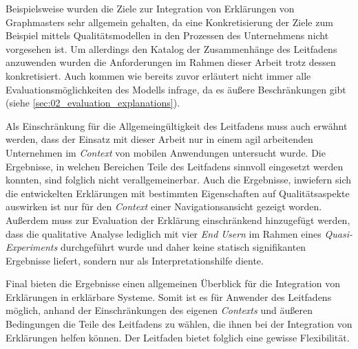 Beispielsweise wurden die Ziele zur Integration von Erklärungen von Graphmasters sehr allgemein gehalten, da eine Konkretisierung der Ziele zum Beispiel mittels Qualitätsmodellen \cite{schneider2012abenteuer} in den Prozessen des Unternehmens nicht vorgesehen ist. Um allerdings den Katalog der Zusammenhänge des Leitfadens anzuwenden wurden die Anforderungen im Rahmen dieser Arbeit trotz dessen konkretisiert. Auch kommen wie bereits zuvor erläutert nicht immer alle Evaluationsmöglichkeiten des Modells infrage, da es äußere Beschränkungen gibt (siehe \autoref{sec:02_evaluation_explanations}).

Als Einschränkung für die Allgemeingültigkeit des Leitfadens muss auch erwähnt werden, dass der Einsatz mit dieser Arbeit nur in einem agil arbeitenden Unternehmen im \textit{Context} von mobilen Anwendungen untersucht wurde. Die Ergebnisse, in welchen Bereichen Teile des Leitfadens sinnvoll eingesetzt werden konnten, sind folglich nicht verallgemeinerbar. Auch die Ergebnisse, inwiefern sich die entwickelten Erklärungen mit bestimmten Eigenschaften auf Qualitätsaspekte auswirken ist nur für den \textit{Context} einer Navigationsansicht gezeigt worden. Außerdem muss zur Evaluation der Erklärung einschränkend hinzugefügt werden, dass die qualitative Analyse lediglich mit vier \textit{End Usern} im Rahmen eines \textit{Quasi-Experiments} durchgeführt wurde und daher keine statisch signifikanten Ergebnisse liefert, sondern nur als Interpretationshilfe diente.

Final bieten die Ergebnisse einen allgemeinen Überblick für die Integration von Erklärungen in erklärbare Systeme. Somit ist es für Anwender des Leitfadens möglich, anhand der Einschränkungen des eigenen \textit{Contexts} und äußeren Bedingungen die Teile des Leitfadens zu wählen, die ihnen bei der Integration von Erklärungen helfen können. Der Leitfaden bietet folglich eine gewisse Flexibilität.